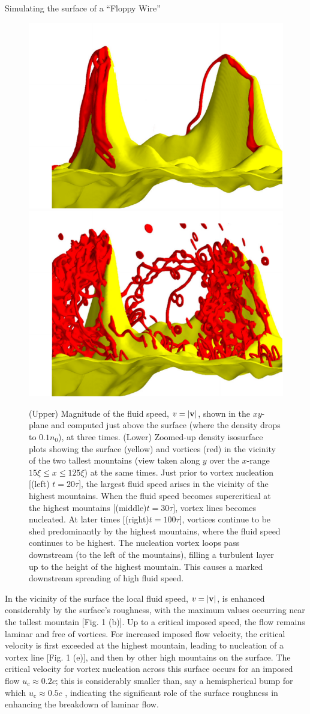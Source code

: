 \begin{chapter}{\label{cha:afm}Simulating the surface of a ``Floppy Wire''}
\begin{figure}[!ht]
{\begin{minipage}{1.1\textwidth}
  \includegraphics[width=0.3\linewidth]{./afm/afm-sub-3101}
  \includegraphics[width=0.3\linewidth]{./afm/afm-sub-10101}
  \end{minipage}
  }
  \caption{(Upper) Magnitude of the fluid speed, $v=|{\bf v}|$, shown in the $xy$-plane and computed just above the surface (where the
density drops to $0.1 n_0$), at three times.  (Lower) Zoomed-up density isosurface plots showing the surface (yellow) and vortices (red) in the vicinity of the two tallest mountains (view taken along $y$ over the $x$-range $15 \xi \leq x \leq 125 \xi$) at the same times.  Just prior to vortex nucleation [(left) $t=20 \tau$], the largest fluid speed arises in the vicinity of the highest mountains.  When the fluid speed becomes supercritical at the highest mountains [(middle)$t=30 \tau$], vortex lines becomes nucleated.  At later times [(right)$t=100 \tau$], vortices continue to be shed predominantly by the highest mountains, where the fluid speed continues to be highest.  
The nucleation vortex loops pass downstream (to the left of the mountains), filling a turbulent layer up to the height of the highest mountain.  This causes a marked downstream spreading of high fluid speed. }
 \end{figure} 
{In the vicinity of the surface the local fluid speed}, $v=|{\bf v}|$, 
is enhanced considerably by the {surface's} roughness, 
with the maximum values occurring near the tallest mountain [Fig. 1 (b)].   Up to a critical imposed speed, the flow remains laminar and free of vortices.  For increased imposed flow velocity, the critical velocity is first exceeded at the highest mountain, leading to nucleation of a vortex line [Fig. 1 (e)], and then by other high mountains on the surface.  The critical velocity for vortex nucleation across this surface occurs for an imposed flow $u_c\approx 0.2 c$; this is considerably smaller than, say a hemispherical bump for which $u_c \approx 0.5 c$ \cite{winiecki},  indicating the significant role of the surface roughness in enhancing the breakdown of laminar flow.  


\end{chapter}
